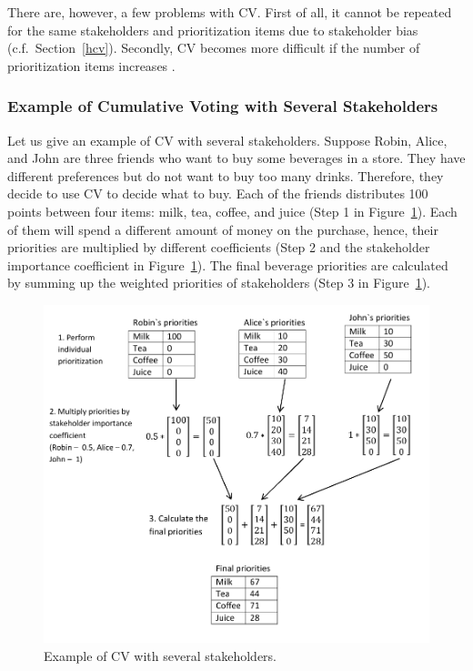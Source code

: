 There are, however, a few problems with CV. First of all, it cannot be repeated for the
same stakeholders and prioritization items due to stakeholder bias
\cite{Leffingwell1999} (c.f.\ Section~\ref{hcv}). Secondly, CV becomes more difficult if the number of prioritization items increases \cite{Berander2009a}.

\subsubsection{Example of Cumulative Voting with Several Stakeholders}

Let us give an example of CV with several stakeholders. Suppose Robin,
Alice, and John are three friends who want to buy some beverages in
a store. They have different preferences but do not want to buy too
many drinks. Therefore, they decide to use CV to decide what to buy.
Each of the friends distributes 100 points between four items: milk,
tea, coffee, and juice (Step 1 in Figure~\ref{fig:Example-of-Cumulative}).
Each of them will spend a different amount of money on the purchase,
hence, their priorities are multiplied by different coefficients
(Step 2 and the stakeholder importance coefficient in Figure~\ref{fig:Example-of-Cumulative}).
The final beverage priorities are calculated by summing up the weighted priorities
of stakeholders (Step 3 in Figure~\ref{fig:Example-of-Cumulative}).


\begin{figure}
	\center
\includegraphics[scale=0.55]{fig/cv}
\caption{\label{fig:Example-of-Cumulative}Example of CV with several stakeholders.}
\end{figure}

